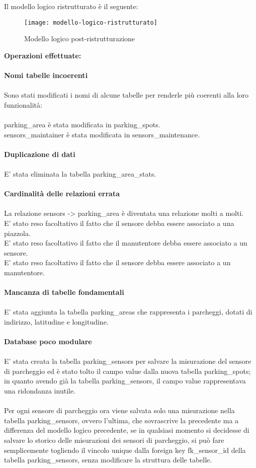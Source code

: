 Il modello logico ristrutturato è il seguente:
\begin{figure}[H]
  \centering
  \texttt{[image: modello-logico-ristrutturato]}
  \caption{Modello logico post-ristrutturazione}
\end{figure}
\leavevmode\newline
\textbf{Operazioni effettuate:}
\\\\
\textbf{Nomi tabelle incoerenti}
\\\\
Sono stati modificati i nomi di alcune tabelle per renderle più coerenti alla loro funzionalità:
\\\\
parking\_area è stata modificata in parking\_spots.
\\
sensors\_maintainer è stata modificata in sensors\_maintenance.
\\\\
\textbf{Duplicazione di dati}
\\\\
E' stata eliminata la tabella parking\_area\_stats.
\\\\
\textbf{Cardinalità delle relazioni errata}
\\\\
La relazione sensors -> parking\_area è diventata una relazione molti a molti.
\\
E' stato reso facoltativo il fatto che il sensore debba essere associato a una piazzola.
\\
E' stato reso facoltativo il fatto che il manutentore debba essere associato a un sensore.
\\
E' stato reso facoltativo il fatto che il sensore debba essere associato a un manutentore.
\\\\
\textbf{Mancanza di tabelle fondamentali}
\\\\
E' stata aggiunta la tabella parking\_areas che rappresenta i parcheggi, dotati di indirizzo, latitudine e 
longitudine.
\\\\
\textbf{Database poco modulare}
\\\\
E' stata creata la tabella parking\_sensors per salvare la misurazione del sensore di parcheggio ed è
stato tolto il campo value dalla nuova tabella parking\_spots; in quanto avendo già la tabella parking\_sensors,
il campo value rappresentava una ridondanza inutile.
\\\\
Per ogni sensore di parcheggio ora viene salvata solo una misurazione nella tabella parking\_sensors, ovvero
l'ultima, che sovrascrive la precedente ma a differenza del modello logico precedente, se in qualsiasi momento
si decidesse di salvare lo storico delle misurazioni dei sensori di parcheggio, si può fare semplicemente togliendo
il vincolo unique dalla foreign key fk\_sensor\_id della tabella parking\_sensors, senza modificare la struttura delle tabelle.